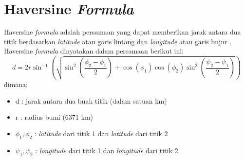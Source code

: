 \section{Haversine \textit{Formula}}
Haversine \textit{formula} adalah persamaan yang dapat memberikan jarak antara
dua titik berdasarkan \textit{latitude} atau garis lintang dan
\textit{longitude} atau garis bujur \cite{haversine}. Haversine
\textit{formula} dinyatakan dalam persamaan berikut ini:
\\
\[d=2r\sin^{-1}(\sqrt{\sin^2(\frac{\phi_2-\phi_1}{2})+\cos(\phi_1)\cos(\phi_2)\sin^2(\frac{\psi_2-\psi_1}{2})})\]
dimana:
\begin{itemize}
  \item d : jarak antara dua buah titik (dalam satuan km)
  
  \item r : radius bumi (6371 km)
   
  \item $\phi_1, \phi_2$ : \textit{latitude} dari titik 1 dan \textit{latitude}
  dari titik 2
  
  \item $\psi_1, \psi_2$ : \textit{longitude} dari titik 1 dan
  \textit{longitude} dari titik 2
\end{itemize}
